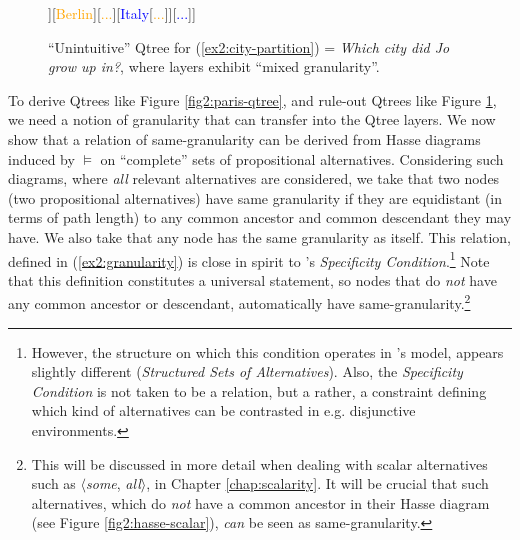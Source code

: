 \begin{figure}[H]
	\centering
		\begin{forest}
			[{CS\\
				Jo grew up in...}[\textcolor{blue}{France}[\textcolor{orange}{{\fbox{Paris}}}][\textcolor{orange}{Lyon}][\textcolor{orange}{...}]][\textcolor{orange}{Berlin}][\textcolor{orange}{...}][\textcolor{blue}{Italy}[\textcolor{orange}{...}]][\textcolor{blue}{...}]]
		\end{forest}
		\caption{``Unintuitive'' Qtree for (\ref{ex2:city-partition}) = \textit{Which city did Jo grow up in?}, where layers exhibit ``mixed granularity''.}\label{fig2:paris-qtree-mixed}
	\end{figure}

To derive Qtrees like Figure \ref{fig2:paris-qtree}, and rule-out Qtrees like Figure \ref{fig2:paris-qtree-mixed}, we need a notion of granularity that can transfer into the Qtree layers. We now show that a relation of same-granularity can be derived from Hasse diagrams induced by $\vDash$ on ``complete'' sets of propositional alternatives. Considering such diagrams, where \textit{all} relevant alternatives are considered, we take that two nodes (two propositional alternatives) have same granularity if they are equidistant (in terms of path length) to any common ancestor and common descendant they may have. We also take that any node has the same granularity as itself. This relation, defined in (\ref{ex2:granularity}) is close in spirit to \textcite{Ippolito2019}'s \textit{Specificity Condition}.\footnote{However, the structure on which this condition operates in \citeauthor{Ippolito2019}'s model, appears slightly different (\textit{Structured Sets of Alternatives}). Also, the \textit{Specificity Condition} is not taken to be a relation, but a rather, a constraint defining which kind of alternatives can be contrasted in e.g. disjunctive environments.} Note that this definition constitutes a universal statement, so nodes that do \textit{not} have any common ancestor or descendant, automatically have same-granularity.\footnote{This will be discussed in more detail when dealing with scalar alternatives such as $\langle$\textit{some}, \textit{all}$\rangle$, in Chapter \ref{chap:scalarity}. It will be crucial that such alternatives, which do \textit{not} have a common ancestor in their Hasse diagram (see Figure \ref{fig2:hasse-scalar}), \textit{can} be seen as same-granularity.}

\begin{exe}
	\label{ex2:granularity}
\end{exe}


